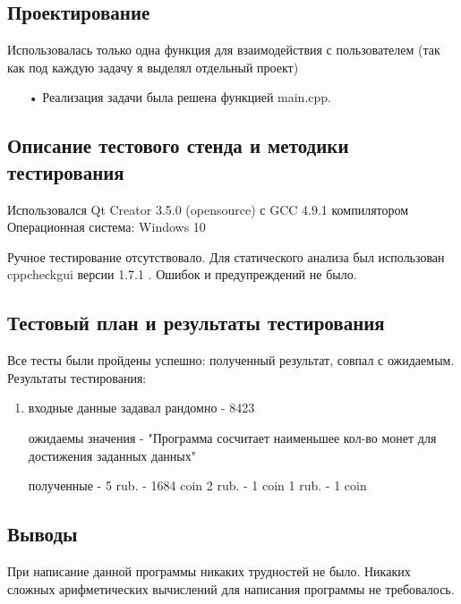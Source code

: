 \documentclass[12pt,a4paper]{report}
\begin{document}
\subsection{Проектирование}

Использовалась только одна функция для взаимодействия с пользователем (так как под каждую задачу я выделял отдельный проект)
\begin{enumerate}
\item[•]  Реализация задачи была решена функцией main.cpp.
\end{enumerate}

\subsection{Описание тестового стенда и методики тестирования}

Использовался Qt Creator 3.5.0 (opensource) с GCC 4.9.1 компилятором
Операционная система: Windows 10


Ручное тестирование отсутствовало.
Для статического анализа был использован cppcheckgui версии 1.7.1 . Ошибок и предупреждений не было.

\subsection{Тестовый план и результаты тестирования}
Все тесты были пройдены успешно: полученный результат, совпал с ожидаемым. Результаты тестирования:
\begin{enumerate}
\item входные данные задавал рандомно - 8423

ожидаемы значения - "Программа сосчитает наименьшее кол-во монет для достижения заданных данных"

полученные - 5 rub. - 1684 coin
             2 rub. - 1 coin
             1 rub. - 1 coin
\end{enumerate}

\subsection{Выводы}

При написание данной программы никаких трудностей не было. Никаких сложных арифметических вычислений для написания программы не требовалось.
\end{document}
